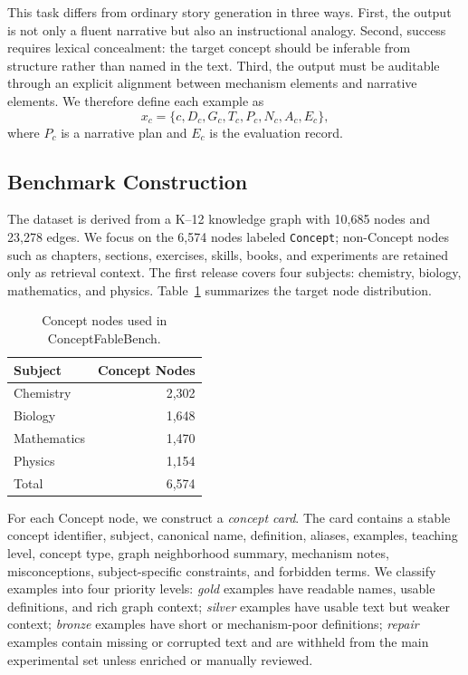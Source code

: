 \documentclass[letterpaper]{article} %
\begin{document}
This task differs from ordinary story generation in three ways. First, the output is not only a fluent narrative but also an instructional analogy. Second, success requires lexical concealment: the target concept should be inferable from structure rather than named in the text. Third, the output must be auditable through an explicit alignment between mechanism elements and narrative elements. We therefore define each example as
\[
x_c = \{c, D_c, G_c, T_c, P_c, N_c, A_c, E_c\},
\]
where $P_c$ is a narrative plan and $E_c$ is the evaluation record.

\subsection{Benchmark Construction}

The dataset is derived from a K--12 knowledge graph with 10,685 nodes and 23,278 edges. We focus on the 6,574 nodes labeled \texttt{Concept}; non-Concept nodes such as chapters, sections, exercises, skills, books, and experiments are retained only as retrieval context. The first release covers four subjects: chemistry, biology, mathematics, and physics. Table~\ref{tab:dataset_stats} summarizes the target node distribution.

\begin{table}[t]
\centering
\small
\begin{tabular}{lr}
\toprule
Subject & Concept Nodes \\
\midrule
Chemistry & 2,302 \\
Biology & 1,648 \\
Mathematics & 1,470 \\
Physics & 1,154 \\
\midrule
Total & 6,574 \\
\bottomrule
\end{tabular}
\caption{Concept nodes used in ConceptFableBench.}
\label{tab:dataset_stats}
\end{table}

For each Concept node, we construct a \emph{concept card}. The card contains a stable concept identifier, subject, canonical name, definition, aliases, examples, teaching level, concept type, graph neighborhood summary, mechanism notes, misconceptions, subject-specific constraints, and forbidden terms. We classify examples into four priority levels: \emph{gold} examples have readable names, usable definitions, and rich graph context; \emph{silver} examples have usable text but weaker context; \emph{bronze} examples have short or mechanism-poor definitions; \emph{repair} examples contain missing or corrupted text and are withheld from the main experimental set unless enriched or manually reviewed.
\end{document}
